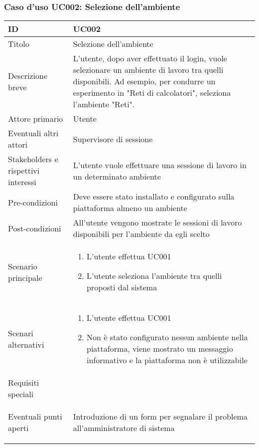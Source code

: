 \documentclass[../../main.tex]{subfiles}
\begin{document}
\subsubsection{Caso d’uso UC002: Selezione dell'ambiente }
\begin{tabularx}{150mm}{|l|X|}
    \hline
    ID                                  & \textbf{UC002}\\
    \hline
    Titolo                              & Selezione dell'ambiente \\
    \hline
    Descrizione breve                   & L'utente, dopo aver effettuato il login, vuole selezionare un ambiente di lavoro tra quelli disponibili. Ad esempio, per condurre un esperimento in "Reti di calcolatori", seleziona l'ambiente "Reti".   \\
    \hline
    Attore primario                     & Utente   \\
    \hline
    Eventuali altri attori              & Supervisore di sessione   \\
    \hline
    Stakeholders e rispettivi interessi & L'utente vuole effettuare una sessione di lavoro in un determinato ambiente   \\
    \hline
    Pre-condizioni                      & Deve essere stato installato e configurato sulla piattaforma almeno un ambiente   \\
    \hline
    Post-condizioni                     & All'utente vengono mostrate le sessioni di lavoro disponibili per l'ambiente da egli scelto  \\
    \hline
    Scenario principale                 & \begin{enumerate}
        \item L'utente effettua UC001
        \item L'utente seleziona l'ambiente tra quelli proposti dal sistema
    \end{enumerate}
            \\
    \hline
    Scenari alternativi                 & \begin {enumerate}
        \item L'utente effettua UC001
        \item Non è stato configurato nessun ambiente nella piattaforma, viene mostrato un messaggio informativo e la piattaforma non è utilizzabile
        \end{enumerate}
            \\
    \hline
    Requisiti speciali                  &    \\
    \hline
    Eventuali punti aperti              &     \begin{enumerate}
        Introduzione di un form per segnalare il problema all'amministratore di sistema
    \end{enumerate}    \\
    \hline
\end{tabularx}
\newpage
\end{document}
